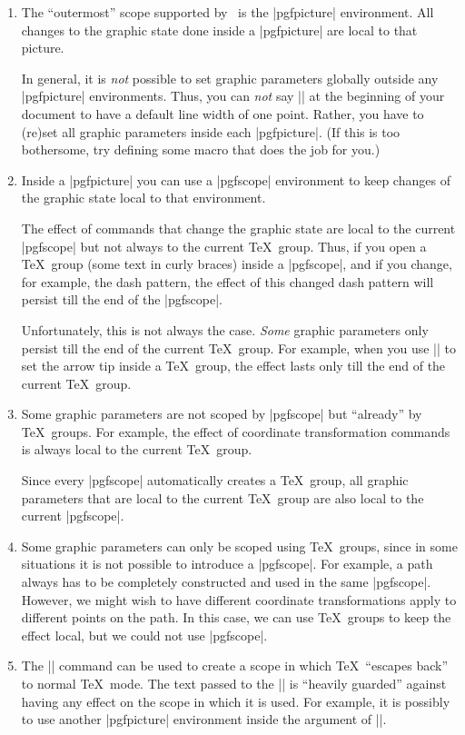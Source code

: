 \begin{enumerate}
\item
  The ``outermost'' scope supported by \pgfname\ is the |{pgfpicture}|
  environment. All changes to the graphic state done inside a
  |{pgfpicture}| are local to that picture.

  In general, it is \emph{not} possible to set graphic parameters
  globally outside any |{pgfpicture}| environments. Thus, you can
  \emph{not} say |\pgfsetlinewidth{1pt}| at the beginning of your
  document to have a default line width of one point. Rather, you have
  to (re)set all graphic parameters inside each |{pgfpicture}|. (If
  this is too bothersome, try defining some macro that does the job
  for you.)
\item
  Inside a |{pgfpicture}| you can use a |{pgfscope}| environment to
  keep changes of the graphic state local to that environment.

  The effect of commands that change the graphic state are local to
  the current |{pgfscope}| but not always to the current \TeX\
  group. Thus, if you open a \TeX\ group (some text in curly braces)
  inside a |{pgfscope}|, and if you change, for example, the dash
  pattern, the effect of this changed dash pattern will persist till
  the end of the |{pgfscope}|.

  Unfortunately, this is not always the case. \emph{Some} graphic
  parameters only persist till the end of the current \TeX\ group. For
  example, when you use |\pgfsetarrows| to set the arrow tip 
  inside a \TeX\ group, the effect lasts only till the end of the
  current \TeX\ group.
\item
  Some graphic parameters are not scoped by |{pgfscope}| but
  ``already'' by \TeX\ groups. For example, the effect of coordinate
  transformation commands is always local to the current \TeX\
  group.

  Since every |{pgfscope}| automatically creates a \TeX\ group, all
  graphic parameters that are local to the current \TeX\ group are
  also local to the current |{pgfscope}|.
\item
  Some graphic parameters can only be scoped using \TeX\ groups, since
  in some situations it is not possible to introduce a
  |{pgfscope}|. For example, a path always has to be completely
  constructed and used in the same |{pgfscope}|. However, we might
  wish to have different coordinate transformations apply to different
  points on the path. In this case, we can use \TeX\ groups to keep
  the effect local, but we could not use |{pgfscope}|.  
\item
  The |\pgftext| command can be used to create a scope in which \TeX\
  ``escapes back'' to normal \TeX\ mode. The text passed to the
  |\pgftext| is ``heavily guarded'' against having any effect on the
  scope in which it is used. For example, it is possibly to use
  another  |{pgfpicture}| environment inside the argument of
  |\pgftext|. 
\end{enumerate}


